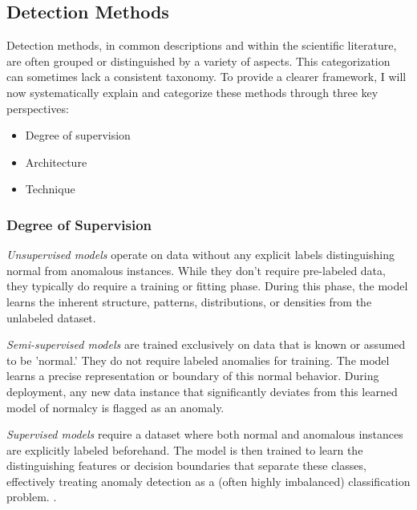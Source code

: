 \documentclass[12pt,oneside]{article}
\begin{document}
\subsection{Detection Methods}
Detection methods, in common descriptions and within the scientific literature, are often grouped or distinguished by a variety of aspects. This categorization can sometimes lack a consistent taxonomy. To provide a clearer framework, I will now systematically explain and categorize these methods through three key perspectives:
\begin{itemize}
    \item Degree of supervision
    \item Architecture
    \item Technique
\end{itemize}

\subsubsection{Degree of Supervision} \textit{Unsupervised models} operate on data without any explicit labels distinguishing normal from anomalous instances. While they don't require pre-labeled data, they typically do require a training or fitting phase. During this phase, the model learns the inherent structure, patterns, distributions, or densities from the unlabeled dataset.\par \textit{Semi-supervised models} are trained exclusively on data that is known or assumed to be 'normal.' They do not require labeled anomalies for training. The model learns a precise representation or boundary of this normal behavior. During deployment, any new data instance that significantly deviates from this learned model of normalcy is flagged as an anomaly. \par \textit{Supervised models} require a dataset where both normal and anomalous instances are explicitly labeled beforehand. The model is then trained to learn the distinguishing features or decision boundaries that separate these classes, effectively treating anomaly detection as a (often highly imbalanced) classification problem. \parencites[pp.~5-6]{boniol2024divetimeseriesanomalydetection}[p.~3]{liu2024elephant}[p.~3-4]{SchmidlEtAl2022Anomaly}.
\end{document}
